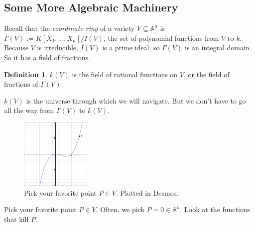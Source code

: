 \documentclass[12pt]{article}
\newcommand{\ita}[1]{\textit{#1}}
\theoremstyle{definition}
\newtheorem{definition}[theorem]{Definition}
\begin{document}
\subsection{Some More Algebraic Machinery}
Recall that the \ita{coordinate ring} of a variety $V\subseteq\mathbb{A}^n$ is $\Gamma(V):=K[X_1,\dotsc,X_n]/I(V)$, the set of polynomial functions from $V$ to $k$. Because $V$ is irreducible, $I(V)$ is a prime ideal, so $\Gamma(V)$ is an integral domain. So it has a field of fractions.
\begin{definition}
    $k(V)$ is the field of rational functions on $V$, or the field of fractions of $\Gamma(V)$.
\end{definition}
$k(V)$ is the universe through which we will navigate. But we don't have to go all the way from $\Gamma(V)$ to $k(V)$.
\begin{figure}[H]
    \centering
    \includegraphics[width=0.3\textwidth]{14.png}
    \caption{Pick your favorite point $P\in V$. Plotted in Desmos.}
\end{figure}
Pick your favorite point $P\in V$. Often, we pick $P=0\in\mathbb{A}^n$. Look at the functions that kill $P$.
\end{document}

